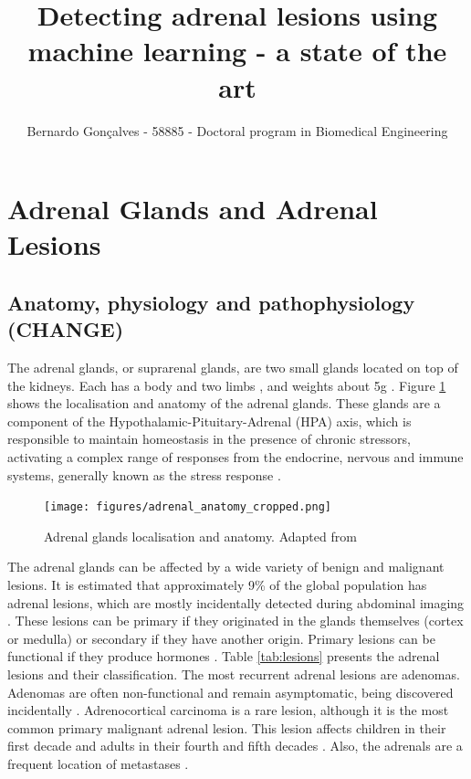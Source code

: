 \documentclass{article}
\title{Detecting adrenal lesions using machine learning - a state of the art}
\author{Bernardo Gonçalves - 58885 - Doctoral program in Biomedical Engineering}
\begin{document}
\maketitle

\section{Adrenal Glands and Adrenal Lesions}

\subsection{Anatomy, physiology and pathophysiology (CHANGE)}

The adrenal glands, or suprarenal glands, are two small glands located on top of
the kidneys.  Each has a body and two limbs \cite{Baba2012}, and weights about
5g \cite{brit}. Figure \ref{fig:adrenal_ana} shows the localisation and anatomy
of the adrenal glands. These glands are a component of the
Hypothalamic-Pituitary-Adrenal (HPA) axis, which is responsible to maintain
homeostasis in the presence of chronic stressors, activating a complex range of
responses from the endocrine, nervous and immune systems, generally known as the
stress response \cite{open}.

\begin{figure}
    \centering
    \texttt{[image: figures/adrenal\_anatomy\_cropped.png]}
    \caption{Adrenal glands localisation and anatomy.  Adapted from \cite{Grossman2022}}
    \label{fig:adrenal_ana}
\end{figure}

The adrenal glands can be affected by a wide variety of benign and malignant
lesions. It is estimated that approximately 9\% of the global population has
adrenal lesions, which are mostly incidentally detected during abdominal imaging
\cite{Dhamija2015}. These lesions can be primary if they originated in the
glands themselves (cortex or medulla) or secondary if they have another origin.
Primary lesions can be functional if they produce hormones \cite{Panda2015}.
Table \ref{tab:lesions} presents the adrenal lesions and their classification.
The most recurrent adrenal lesions are adenomas. Adenomas are often
non-functional and remain asymptomatic, being discovered incidentally
\cite{Platzek2019}. Adrenocortical carcinoma is a rare lesion, although it is
the most common primary malignant adrenal lesion. This lesion affects children
in their first decade and adults in their fourth and fifth decades
\cite{Panda2015}. Also, the adrenals are a frequent location of metastases
\cite{Platzek2019}.
\end{document}
